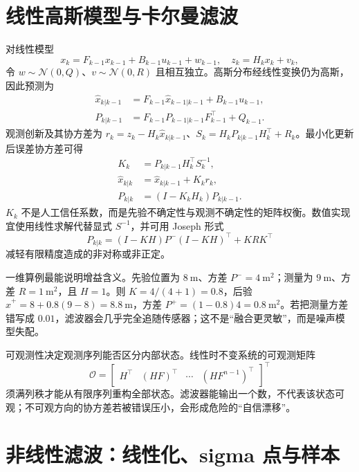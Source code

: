 \section{线性高斯模型与卡尔曼滤波}

对线性模型
\begin{equation}
x_k=F_{k-1}x_{k-1}+B_{k-1}u_{k-1}+w_{k-1},\quad
z_k=H_kx_k+v_k,
\end{equation}
令 $w\sim\mathcal N(0,Q)$、$v\sim\mathcal N(0,R)$ 且相互独立。高斯分布经线性变换仍为高斯，因此预测为
\begin{align}
\hat x_{k|k-1}&=F_{k-1}\hat x_{k-1|k-1}+B_{k-1}u_{k-1},\\
P_{k|k-1}&=F_{k-1}P_{k-1|k-1}F_{k-1}^\top+Q_{k-1}.
\label{eq:kf-predict}
\end{align}
观测创新及其协方差为 $r_k=z_k-H_k\hat x_{k|k-1}$、$S_k=H_kP_{k|k-1}H_k^\top+R_k$。最小化更新后误差协方差可得\cite{kalman1960new}
\begin{align}
K_k&=P_{k|k-1}H_k^\top S_k^{-1},\\
\hat x_{k|k}&=\hat x_{k|k-1}+K_kr_k,\\
P_{k|k}&=(I-K_kH_k)P_{k|k-1}.
\label{eq:kf-update}
\end{align}
$K_k$ 不是人工信任系数，而是先验不确定性与观测不确定性的矩阵权衡。数值实现宜使用线性求解代替显式 $S^{-1}$，并可用 Joseph 形式
\begin{equation}
P_{k|k}=(I-KH)P^-(I-KH)^\top+KRK^\top
\end{equation}
减轻有限精度造成的非对称或非正定。

一维算例最能说明增益含义。先验位置为 $8\ \mathrm m$、方差 $P^-=4\ \mathrm{m^2}$；测量为 $9\ \mathrm m$、方差 $R=1\ \mathrm{m^2}$，且 $H=1$。则 $K=4/(4+1)=0.8$，后验 $\hat x^+=8+0.8(9-8)=8.8\ \mathrm m$，方差 $P^+=(1-0.8)4=0.8\ \mathrm{m^2}$。若把测量方差错写成 $0.01$，滤波器会几乎完全追随传感器；这不是“融合更灵敏”，而是噪声模型失配。

可观测性决定观测序列能否区分内部状态。线性时不变系统的可观测矩阵
\begin{equation}
\mathcal O=\begin{bmatrix}H^\top&(HF)^\top&\cdots&(HF^{n-1})^\top\end{bmatrix}^\top
\end{equation}
须满列秩才能从有限序列重构全部状态。滤波器能输出一个数，不代表该状态可观；不可观方向的协方差若被错误压小，会形成危险的“自信漂移”。

\section{非线性滤波：线性化、sigma 点与样本}

